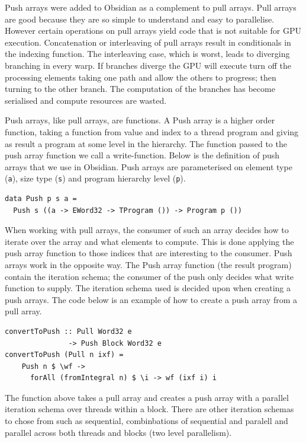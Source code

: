 \documentclass[a4paper]{book}
\begin{document}
Push arrays were added to Obsidian as a complement to pull arrays. Pull arrays are 
good because they are so simple to understand and easy to parallelise. However certain
operations on pull arrays yield code that is not suitable for GPU execution. Concatenation 
or interleaving of pull arrays result in conditionals in the indexing function. The 
interleaving case, which is worst, leads to diverging branching in every warp. If branches 
diverge the GPU will execute turn off the processing elements taking one path and 
allow the others to progress; then turning to the other branch. The computation of the 
branches has become serialised and compute resources are wasted. 

Push arrays, like pull arrays, are functions. A Push array is a higher order 
function, taking a function from value and index to a thread program and giving 
as result a program at some level in the hierarchy. The function passed to the 
push array function we call a write-function. Below is the definition of 
push arrays that we use in Obsidian. Push arrays are parameterised on element 
type ({\tt a}), size type ({\tt s}) and program hierarchy level ({\tt p}). 

\begin{verbatim}
data Push p s a =
  Push s ((a -> EWord32 -> TProgram ()) -> Program p ())
\end{verbatim} 

When working with pull arrays, the consumer of such an array decides how to 
iterate over the array and what elements to compute. This is done applying the 
push array function to those indices that are interesting to the consumer. Push 
arrays work in the opposite way. The Push array function (the result program) contain 
the iteration schema; the consumer of the push only decides what write function 
to supply. The iteration schema used is decided upon when creating a push arrays. 
The code below is an example of how to create a push array from a pull array.

\begin{verbatim} 
convertToPush :: Pull Word32 e 
               -> Push Block Word32 e 
convertToPush (Pull n ixf) =
    Push n $ \wf -> 
      forAll (fromIntegral n) $ \i -> wf (ixf i) i
\end{verbatim} 

The function above takes a pull array and creates a push array with a parallel 
iteration schema over threads within a block. There are other iteration schemas to 
chose from such as sequential, combinbations of sequential and paralell and parallel 
across both threads and blocks (two level parallelism). 
\end{document}
